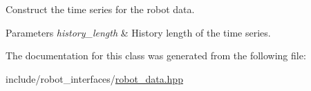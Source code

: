 Construct the time series for the robot data. 


\begin{DoxyParams}{Parameters}
{\em history\+\_\+length} & History length of the time series. \\
\hline
\end{DoxyParams}


The documentation for this class was generated from the following file\+:\begin{DoxyCompactItemize}
\item 
include/robot\+\_\+interfaces/\hyperlink{robot__data_8hpp}{robot\+\_\+data.\+hpp}\end{DoxyCompactItemize}
